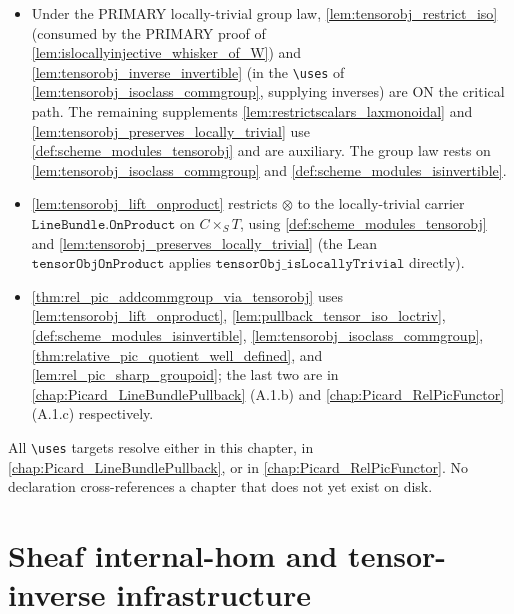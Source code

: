 \begin{itemize}
    \cref{lem:tensorobj_restrict_iso} and \cref{lem:tensorobj_inverse_invertible}
    on top of the assembled locally-trivial associator/unitors/braiding; the
    \(\mathrm{Units}(\mathrm{Skeleton}(\Scheme.\mathtt{Modules}\,X))\) presentation
    via \texttt{jw\_ismonoidal} is retained as the route~(e) fallback.
  \item Under the PRIMARY locally-trivial group law, \cref{lem:tensorobj_restrict_iso}
    (consumed by the PRIMARY proof of \cref{lem:islocallyinjective_whisker_of_W}) and
    \cref{lem:tensorobj_inverse_invertible} (in the \texttt{\textbackslash uses} of
    \cref{lem:tensorobj_isoclass_commgroup}, supplying inverses) are ON the critical
    path. The remaining supplements
    \cref{lem:restrictscalars_laxmonoidal} and
    \cref{lem:tensorobj_preserves_locally_trivial}
    use \cref{def:scheme_modules_tensorobj} and are auxiliary. The group law rests on
    \cref{lem:tensorobj_isoclass_commgroup} and \cref{def:scheme_modules_isinvertible}.
  \item \cref{lem:tensorobj_lift_onproduct} restricts \(\otimes\) to the
    locally-trivial carrier \(\texttt{LineBundle.OnProduct}\) on \(C \times_S T\),
    using \cref{def:scheme_modules_tensorobj} and
    \cref{lem:tensorobj_preserves_locally_trivial}
    (the Lean \(\mathtt{tensorObjOnProduct}\) applies
    \(\mathtt{tensorObj\_isLocallyTrivial}\) directly).
  \item \cref{thm:rel_pic_addcommgroup_via_tensorobj} uses
    \cref{lem:tensorobj_lift_onproduct},
    \cref{lem:pullback_tensor_iso_loctriv},
    \cref{def:scheme_modules_isinvertible},
    \cref{lem:tensorobj_isoclass_commgroup},
    \cref{thm:relative_pic_quotient_well_defined}, and
    \cref{lem:rel_pic_sharp_groupoid}; the last two are in
    \cref{chap:Picard_LineBundlePullback} (A.1.b) and
    \cref{chap:Picard_RelPicFunctor} (A.1.c) respectively.
\end{itemize}
All \texttt{\textbackslash uses} targets resolve either in this chapter, in
\cref{chap:Picard_LineBundlePullback}, or in
\cref{chap:Picard_RelPicFunctor}. No declaration cross-references a
chapter that does not yet exist on disk.

\section{Sheaf internal-hom and tensor-inverse infrastructure}
\label{sec:tensorobj_dual_infra}

